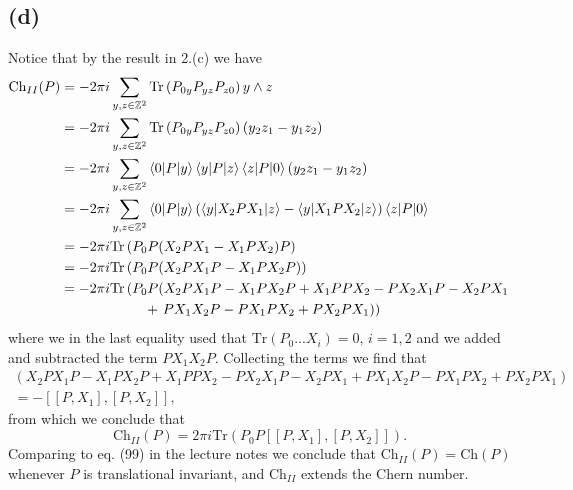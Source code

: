 \documentclass[a4paper,11pt]{article}
\newcommand{\trace}[1]{\text{Tr}\left(#1\right)}
\newcommand{\Z}{\mathbb{Z}}
\numberwithin{equation}{section}
\begin{document}
\subsection*{(d)}
Notice that by the result in 2.(c) we have \begin{equation}
\begin{aligned}
\text{Ch}_{II}(P)&=-2\pi i\sum_{y,z\in\Z^2}\trace{P_{0y}P_{yz}P_{z0}}y\wedge z\\&=-2\pi i\sum_{y,z\in\Z^2}\trace{P_{0y}P_{yz}P_{z0}}(y_2z_1-y_1z_2)\\
&=-2\pi i\sum_{y,z\in\Z^2}\braket{0|P|y}\braket{y|P|z}\braket{z|P|0}(y_2z_1-y_1z_2)\\
&=-2\pi i\sum_{y,z\in\Z^2}\braket{0|P|y}(\braket{y|X_2PX_1|z}-\braket{y|X_1PX_2|z})\braket{z|P|0}\\
&=-2\pi i\trace{P_0P(X_2PX_1-X_1PX_2)P}\\
&=-2\pi i\trace{P_0P(X_2PX_1P-X_1PX_2P)}\\
&=-2\pi i\text{Tr}\left(P_0P(X_2PX_1P-X_1PX_2P+X_1PPX_2-PX_2X_1P-X_2PX_1\right.\\&\qquad\qquad\qquad+\left.PX_1X_2P-PX_1PX_2+PX_2PX_1)\right)
\end{aligned}
\end{equation}
where we in the last equality used that $ \trace{P_0...X_i}=0 $, $ i=1,2 $ and we added and subtracted the term $ PX_1X_2P $. Collecting the terms we find that \begin{equation}
\begin{aligned}
\left(X_2PX_1P-X_1PX_2P+X_1PPX_2-PX_2X_1P-X_2PX_1+PX_1X_2P-PX_1PX_2+PX_2PX_1\right)\\=-\left[[P,X_1],[P,X_2]\right],
\end{aligned}
\end{equation}
from which we conclude that \begin{equation}
\text{Ch}_{II}(P)=2\pi i \trace{P_0P\left[[P,X_1],[P,X_2]\right]}.
\end{equation}
Comparing to  eq. (99) in the lecture notes we conclude that $ \text{Ch}_{II}(P)=\text{Ch}(P) $ whenever $ P $ is translational invariant, and $ \text{Ch}_{II} $ extends the Chern number.
\end{document}
